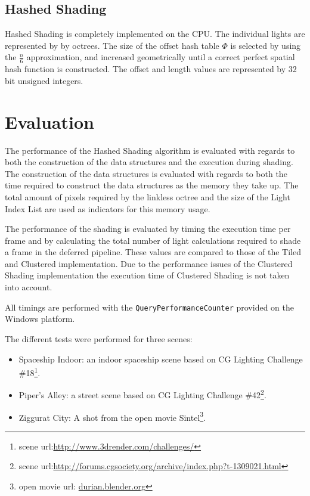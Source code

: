 \subsection{Hashed Shading}

Hashed Shading is completely implemented on the CPU.  The individual lights are
represented by by octrees. The size of the offset hash table $\Phi$ is selected
by using the $\frac{n}{6}$ approximation, and increased geometrically until a correct
perfect spatial hash function is constructed. The offset and length values are
represented by 32 bit unsigned integers.

\section{Evaluation}

The performance of the Hashed Shading algorithm is evaluated with regards to both
the construction of the data structures and the execution during shading. The construction of
the data structures is evaluated with regards to both the time required to construct the
data structures as the memory they take up. The total amount of pixels required by the linkless
octree and the size of the Light Index List are used as indicators for this memory usage.

The performance of the shading is evaluated by timing the execution time per frame and by
calculating the total number of light calculations required to shade a frame in the
deferred pipeline. These values are compared to those of the Tiled and Clustered implementation.
Due to the performance issues of the Clustered Shading implementation the execution time of
Clustered Shading is not taken into account.

All timings are performed with the \texttt{QueryPerformanceCounter} provided on the Windows
platform.

The different tests were performed for three scenes:

\begin{itemize}
  \item Spaceship Indoor: an indoor spaceship scene based on CG Lighting Challenge \#18\footnote{scene url:\url{http://www.3drender.com/challenges/}}.
  \item Piper's Alley: a street scene based on CG Lighting Challenge \#42\footnote{scene url:\url{http://forums.cgsociety.org/archive/index.php?t-1309021.html}}.
  \item Ziggurat City: A shot from the open movie Sintel\footnote{open movie url: \url{durian.blender.org}}.
\end{itemize}

